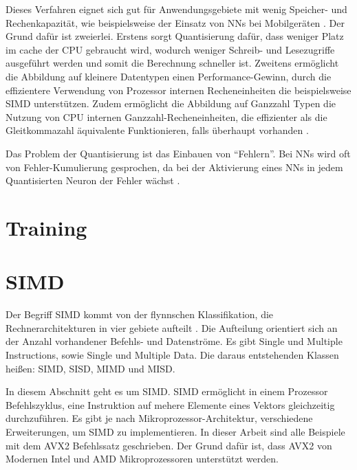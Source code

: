Dieses Verfahren eignet sich gut für Anwendungsgebiete mit wenig Speicher- und Rechenkapazität, wie beispielsweise der Einsatz von \acp{NN} bei Mobilgeräten \cite{MaQuantization2019, Gysel2016}. Der Grund dafür ist zweierlei. Erstens sorgt Quantisierung dafür, dass weniger Platz im cache der CPU gebraucht wird, wodurch weniger Schreib- und Lesezugriffe ausgeführt werden und somit die Berechnung schneller ist. Zweitens ermöglicht die Abbildung auf kleinere Datentypen einen Performance-Gewinn, durch die effizientere Verwendung von Prozessor internen Recheneinheiten die beispielsweise \ac{SIMD} unterstützen. Zudem ermöglicht die Abbildung auf Ganzzahl Typen die Nutzung von CPU internen Ganzzahl-Recheneinheiten, die effizienter als die Gleitkommazahl äquivalente Funktionieren, falls überhaupt vorhanden \cite{Jacob2017}.

Das Problem der Quantisierung ist das Einbauen von \enquote{Fehlern}. Bei \acp{NN} wird oft von Fehler-Kumulierung gesprochen, da bei der Aktivierung eines \acp{NN} in jedem Quantisierten Neuron der Fehler wächst \cite{Park2018}.

\section{Training}

\section{SIMD}

Der Begriff \ac{SIMD} kommt von der flynnschen Klassifikation, die Rechnerarchitekturen in vier gebiete aufteilt \cite{Flynn1972}. Die Aufteilung orientiert sich an der Anzahl vorhandener Befehls- und Datenströme. Es gibt Single und Multiple Instructions, sowie Single und Multiple Data. Die daraus entstehenden Klassen heißen: \ac{SIMD}, \ac{SISD}, \ac{MIMD} und \ac{MISD}.

In diesem Abschnitt geht es um \ac{SIMD}. \ac{SIMD} ermöglicht in einem Prozessor Befehlszyklus, eine Instruktion auf mehere Elemente eines Vektors gleichzeitig durchzuführen. Es gibt je nach Mikroprozessor-Architektur, verschiedene Erweiterungen, um \ac{SIMD} zu implementieren. In dieser Arbeit sind alle Beispiele mit dem \ac{AVX2} Befehlssatz geschrieben. Der Grund dafür ist, dass \ac{AVX2} von Modernen Intel und AMD Mikroprozessoren unterstützt werden.


